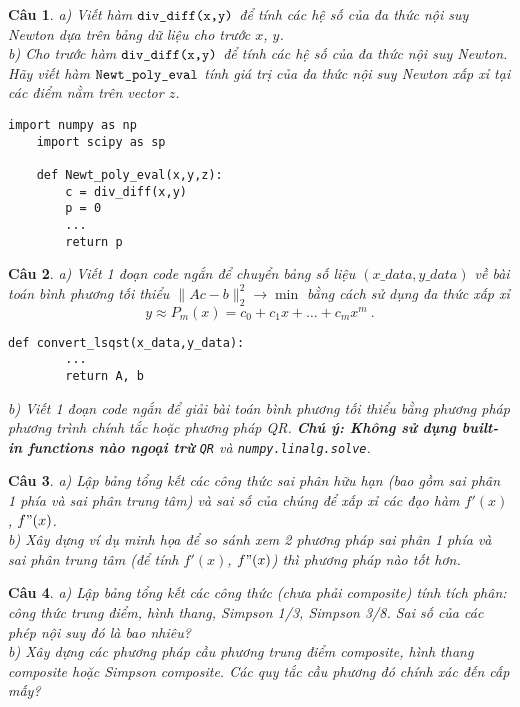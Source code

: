 \documentclass[11pt]{article}
\newtheorem{bt}{Câu}
\begin{document}
\begin{bt}\label{lt3}
a) Viết hàm $\verb|div_diff(x,y)|$ để tính các hệ số của đa thức nội suy Newton dựa trên bảng dữ liệu cho trước $x$, $y$. \\
b) Cho trước hàm $\verb|div_diff(x,y)|$ để tính các hệ số của đa thức nội suy Newton. Hãy viết hàm $\verb|Newt_poly_eval|$ tính giá trị của đa thức nội suy Newton xấp xỉ tại các điểm nằm trên vector $z$.
%
\begin{lstlisting}[frame=single]
	import numpy as np
	import scipy as sp
	
	def Newt_poly_eval(x,y,z):
		c = div_diff(x,y)
		p = 0	
		...
		return p
\end{lstlisting}
%
\end{bt}

\begin{bt}\label{lt4}
a) Viết 1 đoạn code ngắn để chuyển bảng số liệu  $(x\_data,y\_data)$ về bài toán bình phương tối thiểu $\|Ac-b\|_2^2 \longrightarrow \min$ bằng cách sử dụng đa thức xấp xỉ 
%
\[
y \approx P_m(x) = c_0 + c_1 x + \dots + c_m x^m \ .\]
%
\begin{lstlisting}[frame = single]
	def convert_lsqst(x_data,y_data):
		...
		return A, b
\end{lstlisting}
b) Viết 1 đoạn code ngắn để giải bài toán bình phương tối thiểu bằng phương pháp phương trình chính tắc hoặc phương pháp QR.
\textbf{Chú ý: Không sử dụng built-in functions nào ngoại trừ }
\verb|QR| và \verb|numpy.linalg.solve|.
\end{bt}

\begin{bt}\label{lt5}
	a) Lập bảng tổng kết các công thức sai phân hữu hạn (bao gồm sai phân 1 phía và sai phân trung tâm) và sai số của chúng để xấp xỉ các đạo hàm $f'(x)$, $f"(x)$. \\
	b) Xây dựng ví dụ minh họa để so sánh xem 2 phương pháp sai phân 1 phía và sai phân trung tâm (để tính $f'(x)$, $f"(x)$) thì phương pháp nào tốt hơn. 	
\end{bt}

\begin{bt}\label{lt6}
a) Lập bảng tổng kết các công thức (chưa phải composite) tính tích phân: công thức trung điểm, hình thang, Simpson 1/3, Simpson 3/8. Sai số của các phép nội suy đó là bao nhiêu? \\
b) Xây dựng các phương pháp cầu phương trung điểm composite, hình thang composite hoặc Simpson composite. Các quy tắc cầu phương đó chính xác đến cấp mấy?
\end{bt}
\end{document}

